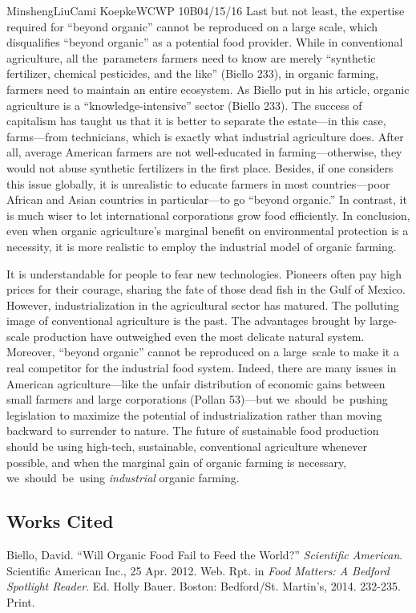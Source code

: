 \documentclass[12pt,letterpaper]{article}
\begin{document}
\begin{mla}{Minsheng}{Liu}{Cami Koepke}{WCWP 10B}{04/15/16}
Last but not least, the expertise required for ``beyond organic'' cannot
be reproduced on a large scale, which disqualifies ``beyond organic'' as
a potential food provider. While in conventional agriculture, all
the~parameters farmers need to know are merely ``synthetic fertilizer,
chemical pesticides, and the like'' (Biello 233), in organic farming,
farmers need to maintain an entire ecosystem. As Biello put in his
article, organic agriculture is a ``knowledge-intensive'' sector (Biello
233). The success of capitalism has taught us that it is better to
separate the estate---in this case, farms---from technicians, which is
exactly what industrial agriculture does. After all, average American
farmers are not well-educated in farming---otherwise, they would not
abuse synthetic fertilizers in the first place. Besides, if one
considers this issue globally, it is unrealistic to educate farmers in
most countries---poor African and Asian countries in particular---to go
``beyond organic.'' In contrast, it is much wiser to let international
corporations grow food efficiently. In conclusion, even when organic
agriculture's marginal benefit on environmental protection is a
necessity, it is more realistic to employ the industrial model of
organic farming.

It is understandable for people to fear new technologies. Pioneers often
pay high prices for their courage, sharing the fate of those dead fish
in the Gulf of Mexico. However, industrialization in the agricultural
sector has matured. The polluting image of conventional agriculture is
the past. The advantages brought by large-scale production have
outweighed even the most delicate natural system. Moreover, ``beyond
organic'' cannot be reproduced on a large~scale to make it a real
competitor for the industrial food system. Indeed, there are many issues
in American agriculture---like the unfair distribution of economic gains
between small farmers and large corporations (Pollan 53)---but
we~should~be~pushing legislation to maximize the potential of
industrialization rather than moving backward to surrender to nature.
The future of sustainable food production should be using high-tech,
sustainable, conventional agriculture whenever possible, and when the
marginal gain of organic farming is necessary, we~should~be~using
\emph{industrial} organic farming.

\subsection*{Works Cited}
\bibent Biello, David. ``Will Organic Food Fail to Feed the World?''
\textit{Scientific American}. Scientific American Inc., 25 Apr. 2012. Web. Rpt.
in \textit{Food Matters: A Bedford Spotlight Reader}. Ed. Holly Bauer. Boston:
Bedford/St. Martin's, 2014. 232-235. Print.


\end{mla}
\end{document}
